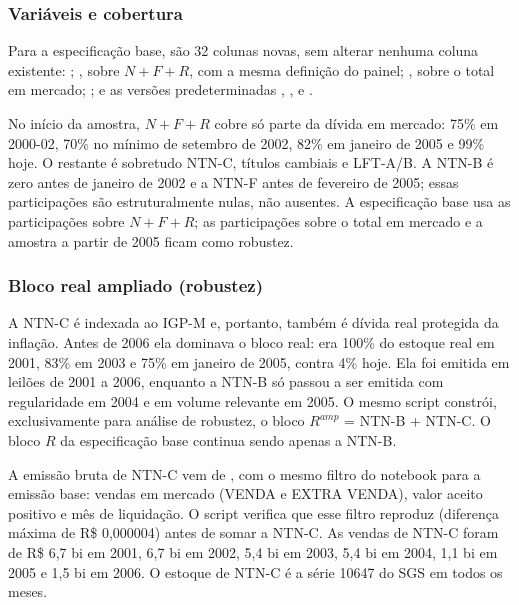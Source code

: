 \documentclass[12pt,a4paper]{article}
\begin{document}
\subsubsection{Variáveis e cobertura}

Para a especificação base, são 32 colunas novas, sem alterar nenhuma coluna existente:
; , sobre \(N+F+R\), com a
mesma definição do painel; , sobre o total em mercado;
; e as versões predeterminadas
, , 
e .

No início da amostra, \(N+F+R\) cobre só parte da dívida em mercado: 75\% em
2000-02, 70\% no mínimo de setembro de 2002, 82\% em janeiro de 2005 e 99\% hoje. O
restante é sobretudo NTN-C, títulos cambiais e LFT-A/B. A NTN-B é zero antes de
janeiro de 2002 e a NTN-F antes de fevereiro de 2005; essas participações são
estruturalmente nulas, não ausentes. A especificação base usa as participações
sobre \(N+F+R\); as participações sobre o total em mercado e a amostra a partir de
2005 ficam como robustez.

\subsubsection{Bloco real ampliado (robustez)}

A NTN-C é indexada ao IGP-M e, portanto, também é dívida real protegida da
inflação. Antes de 2006 ela dominava o bloco real: era 100\% do estoque real em
2001, 83\% em 2003 e 75\% em janeiro de 2005, contra 4\% hoje. Ela foi emitida em
leilões de 2001 a 2006, enquanto a NTN-B só passou a ser emitida com regularidade
em 2004 e em volume relevante em 2005. O mesmo script constrói, exclusivamente para
análise de robustez, o bloco \(R^{amp}\) = NTN-B + NTN-C. O bloco \(R\) da
especificação base continua sendo apenas a NTN-B.

A emissão bruta de NTN-C vem de , com
o mesmo filtro do notebook para a emissão base: vendas em mercado (VENDA e EXTRA
VENDA), valor aceito positivo e mês de liquidação. O script verifica que esse filtro
reproduz  (diferença máxima de R\$ 0,000004) antes de somar a
NTN-C. As vendas de NTN-C foram de R\$ 6,7 bi em 2001, 6,7 bi em 2002, 5,4 bi em 2003,
5,4 bi em 2004, 1,1 bi em 2005 e 1,5 bi em 2006. O estoque de NTN-C é a série 10647 do
SGS em todos os meses.
\end{document}
